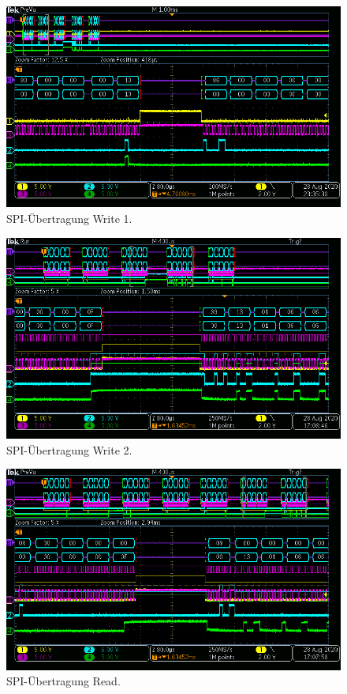 \begin{figure}[H]
\center
\includegraphics[width = \textwidth]{graphics/TMC6200_Beschreiben2}
\caption{SPI-Übertragung Write 1.}
\label{fig:TMC6200_Beschreiben2}
\end{figure}

\begin{figure}[H]
\center
\includegraphics[width = \textwidth]{graphics/TMC6200_Beschreiben}
\caption{SPI-Übertragung Write 2.}
\label{fig:TMC6200_Beschreiben}
\end{figure}

\begin{figure}[H]
\center
\includegraphics[width = \textwidth]{graphics/TMC6200_Lesen}
\caption{SPI-Übertragung Read.}
\label{fig:TMC6200_Lesen}
\end{figure}

